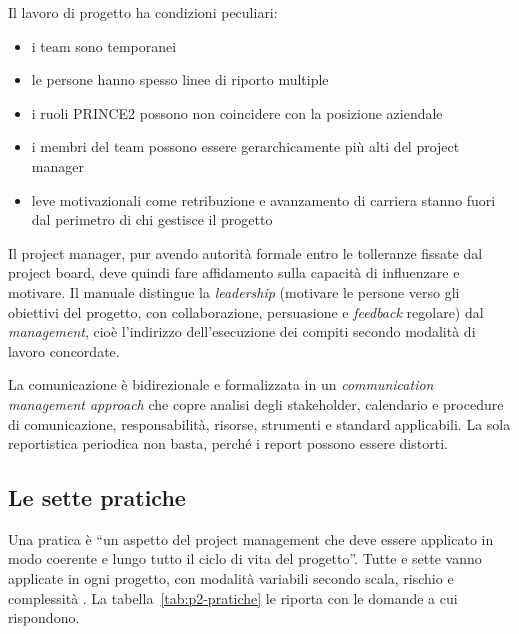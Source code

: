 Il lavoro di progetto ha condizioni peculiari:
\begin {itemize}
\item i team sono temporanei
\item le persone hanno spesso linee di riporto multiple
\item i ruoli PRINCE2 possono non coincidere con la posizione aziendale
\item i membri del team possono essere gerarchicamente pi\`u alti del project
manager
\item leve motivazionali come retribuzione e avanzamento di carriera stanno
fuori dal perimetro di chi gestisce il progetto
\end {itemize}
Il project manager, pur avendo autorit\`a formale entro le tolleranze fissate
dal project board, deve quindi fare affidamento sulla capacit\`a di influenzare
e motivare. Il manuale distingue la \emph{leadership} (motivare le persone
verso gli obiettivi del progetto, con collaborazione, persuasione
e \emph{feedback} regolare) dal \emph{management}, cio\`e l'indirizzo
dell'esecuzione dei compiti secondo modalit\`a di lavoro concordate.

La comunicazione \`e bidirezionale e formalizzata in un \emph{communication
management approach} che copre analisi degli stakeholder, calendario e procedure
di comunicazione, responsabilit\`a, risorse, strumenti e standard applicabili.
La sola reportistica periodica non basta, perch\'e i report possono essere
distorti.


\subsection{Le sette pratiche}

Una pratica \`e ``un aspetto del project management che deve essere applicato in
modo coerente e lungo tutto il ciclo di vita del progetto''. Tutte e sette vanno
applicate in ogni progetto, con modalit\`a variabili secondo scala, rischio e
complessit\`a \cite{prince27}. La tabella~\ref{tab:p2-pratiche} le riporta con
le domande a cui rispondono.

